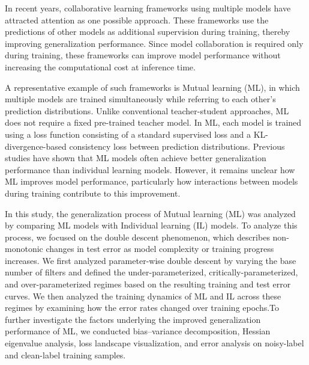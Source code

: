 \documentclass[dvipdfmx]{nolta}        %
\begin{document}
In recent years, collaborative learning frameworks using multiple models have attracted attention as one possible approach. These frameworks use the predictions of other models as additional supervision during training, thereby improving generalization performance. Since model collaboration is required only during training, these frameworks can improve model performance without increasing the computational cost at inference time.

A representative example of such frameworks is Mutual learning (ML)\cite{zhang_deep_2018}, in which multiple models are trained simultaneously while referring to each other's prediction distributions. Unlike conventional teacher-student approaches, ML does not require a fixed pre-trained teacher model. In ML, each model is trained using a loss function consisting of a standard supervised loss and a KL-divergence-based consistency loss between prediction distributions. Previous studies have shown that ML models often achieve better generalization performance than individual learning models. However, it remains unclear how ML improves model performance, particularly how interactions between models during training contribute to this improvement.

In this study, the generalization process of Mutual learning (ML) was analyzed by comparing ML models with Individual learning (IL) models. To analyze this process, we focused on the double descent phenomenon\cite{belkin_reconciling_2019,nakkiran_deep_2021}, which describes non-monotonic changes in test error as model complexity or training progress increases. We first analyzed parameter-wise double descent by varying the base number of filters and defined the under-parameterized, critically-parameterized, and over-parameterized regimes based on the resulting training and test error curves. We then analyzed the training dynamics of ML and IL across these regimes by examining how the error rates changed over training epochs.To further investigate the factors underlying the improved generalization performance of ML, we conducted bias--variance decomposition, Hessian eigenvalue analysis, loss landscape visualization, and error analysis on noisy-label and clean-label training samples.
\end{document}
